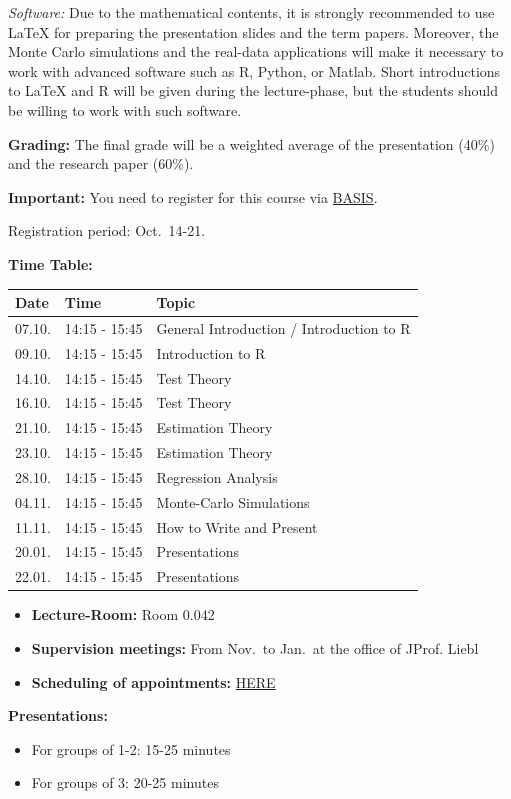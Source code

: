 \documentclass[]{book}
\providecommand{\tightlist}{%
  \setlength{\itemsep}{0pt}\setlength{\parskip}{0pt}}
\theoremstyle{definition}
\theoremstyle{definition}
\theoremstyle{definition}
\theoremstyle{remark}
\begin{document}
\emph{Software:} Due to the mathematical contents, it is strongly recommended to use LaTeX for preparing the presentation slides and the term papers. Moreover, the Monte Carlo simulations and the real-data applications will make it necessary to work with advanced software such as R, Python, or Matlab. Short introductions to LaTeX and R will be given during the lecture-phase, but the students should be willing to work with such software.

\textbf{Grading:} The final grade will be a weighted average of the presentation (40\%) and the research paper (60\%).

\textbf{Important:} You need to register for this course via \href{https://basis.uni-bonn.de/}{BASIS}.

Registration period: Oct.~14-21.

\textbf{Time Table:}

\begin{longtable}[]{@{}lll@{}}
\toprule
Date & Time & Topic\tabularnewline
\midrule
\endhead
07.10. & 14:15 - 15:45 & General Introduction / Introduction to R\tabularnewline
09.10. & 14:15 - 15:45 & Introduction to R\tabularnewline
14.10. & 14:15 - 15:45 & Test Theory\tabularnewline
16.10. & 14:15 - 15:45 & Test Theory\tabularnewline
21.10. & 14:15 - 15:45 & Estimation Theory\tabularnewline
23.10. & 14:15 - 15:45 & Estimation Theory\tabularnewline
28.10. & 14:15 - 15:45 & Regression Analysis\tabularnewline
04.11. & 14:15 - 15:45 & Monte-Carlo Simulations\tabularnewline
11.11. & 14:15 - 15:45 & How to Write and Present\tabularnewline
20.01. & 14:15 - 15:45 & Presentations\tabularnewline
22.01. & 14:15 - 15:45 & Presentations\tabularnewline
\bottomrule
\end{longtable}

\begin{itemize}
\tightlist
\item
  \textbf{Lecture-Room:} Room 0.042
\item
  \textbf{Supervision meetings:} From Nov.~to Jan.~at the office of JProf. Liebl
\item
  \textbf{Scheduling of appointments:} \href{https://docs.google.com/spreadsheets/d/1clb0ple3GaRlwod5JOKK84A996p1BKNMSs32JrqBZ_A/edit?usp=sharing}{HERE}
\end{itemize}

\textbf{Presentations:}

\begin{itemize}
\tightlist
\item
  For groups of 1-2: 15-25 minutes
\item
  For groups of 3: 20-25 minutes
\end{itemize}
\end{document}
